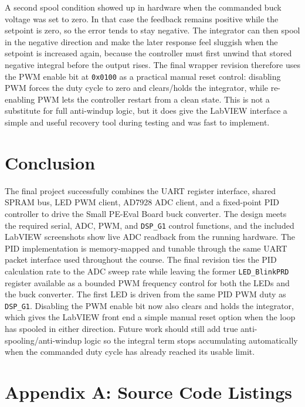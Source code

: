 \documentclass[12pt]{article}
\begin{document}
\noindent A second spool condition showed up in hardware when the commanded buck voltage was set to zero. In that case the feedback remains positive while the setpoint is zero, so the error tends to stay negative. The integrator can then spool in the negative direction and make the later response feel sluggish when the setpoint is increased again, because the controller must first unwind that stored negative integral before the output rises. The final wrapper revision therefore uses the PWM enable bit at \texttt{0x0100} as a practical manual reset control: disabling PWM forces the duty cycle to zero and clears/holds the integrator, while re-enabling PWM lets the controller restart from a clean state. This is not a substitute for full anti-windup logic, but it does give the LabVIEW interface a simple and useful recovery tool during testing and was fast to implement.

\section*{Conclusion}

The final project successfully combines the UART register interface, shared SPRAM bus, LED PWM client, AD7928 ADC client, and a fixed-point PID controller to drive the Small PE-Eval Board buck converter. The design meets the required serial, ADC, PWM, and \texttt{DSP\_G1} control functions, and the included LabVIEW screenshots show live ADC readback from the running hardware. The PID implementation is memory-mapped and tunable through the same UART packet interface used throughout the course. The final revision ties the PID calculation rate to the ADC sweep rate while leaving the former \texttt{LED\_BlinkPRD} register available as a bounded PWM frequency control for both the LEDs and the buck converter. The first LED is driven from the same PID PWM duty as \texttt{DSP\_G1}. Disabling the PWM enable bit now also clears and holds the integrator, which gives the LabVIEW front end a simple manual reset option when the loop has spooled in either direction. Future work should still add true anti-spooling/anti-windup logic so the integral term stops accumulating automatically when the commanded duty cycle has already reached its usable limit.

\appendix

\section*{Appendix A: Source Code Listings}
\end{document}
